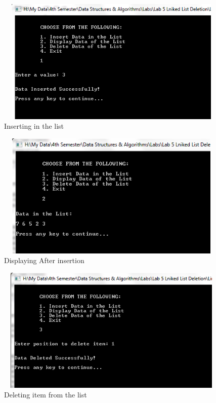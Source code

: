 \documentclass[11pt]{article}            %
\begin{document}
\begin{figure}[H]
\centering
  \includegraphics[width=12cm,height=6cm,keepaspectratio]{1.png}
\caption{Inserting in the list}
\label{Figure:1}    
\end{figure}

\begin{figure}[H]
\centering
  \includegraphics[width=12cm,height=6cm,keepaspectratio]{2.png}
\caption{Displaying After insertion}
\label{Figure:1}    
\end{figure}

\begin{figure}[H]
\centering
  \includegraphics[width=12cm,height=6cm,keepaspectratio]{3.png}
\caption{Deleting item from the list}
\label{Figure:1}    
\end{figure}
\end{document}
